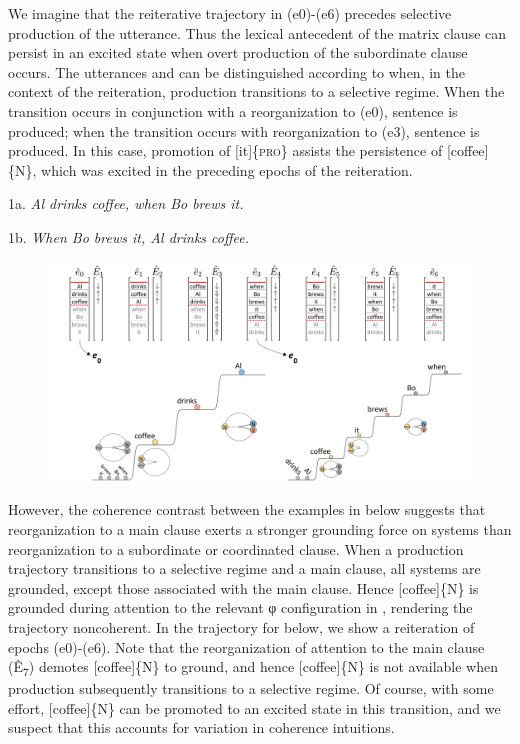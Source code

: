   We imagine that the reiterative trajectory in (e0)-(e6) precedes selective production of the utterance. Thus the lexical antecedent of the matrix clause can persist in an excited state when overt production of the subordinate clause occurs. The utterances  and  can be distinguished according to when, in the context of the reiteration, production transitions to a selective regime. When the transition occurs in conjunction with a reorganization to (e0), sentence  is produced; when the transition occurs with reorganization to (e3), sentence  is produced. In this case, promotion of [it]\{\textsc{pro}\} assists the persistence of [coffee]\{N\}, which was excited in the preceding epochs of the reiteration.

1a. \textit{Al drinks coffee, when Bo brews it.}

1b. \textit{When Bo brews it, Al drinks coffee.}    

  
\begin{figure}
\includegraphics[width=\textwidth]{figures/Tilsen-img154.png}
\caption{\missingcaption}
\label{fig:}
\end{figure}
 

  However, the coherence contrast between the examples in  below suggests that reorganization to a main clause exerts a stronger grounding force on systems than reorganization to a subordinate or coordinated clause. When a production trajectory transitions to a selective regime and a main clause, all systems are grounded, except those associated with the main clause. Hence [coffee]\{N\} is grounded during attention to the relevant φ configuration in , rendering the trajectory noncoherent. In the trajectory for  below, we show a reiteration of epochs (e0)-(e6). Note that the reorganization of attention to the main clause (Ê\textsubscript{7}) demotes [coffee]\{N\} to ground, and hence [coffee]\{N\} is not available when production subsequently transitions to a selective regime. Of course, with some effort, [coffee]\{N\} can be promoted to an excited state in this transition, and we suspect that this accounts for variation in coherence intuitions. 

